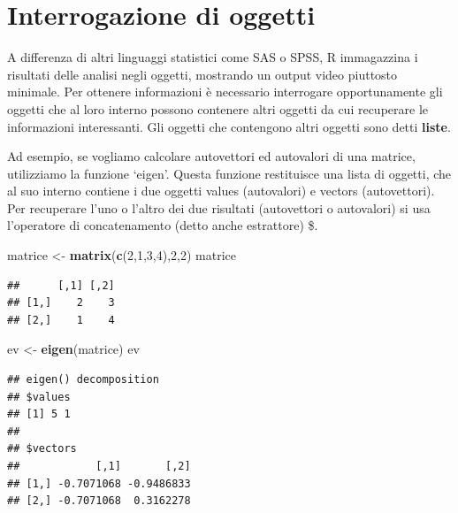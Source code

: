\documentclass[a4paper,12pt,oneside]{book}
\newenvironment{Shaded}{\begin{snugshade}}{\end{snugshade}}
\newcommand{\KeywordTok}[1]{\textcolor[rgb]{0.13,0.29,0.53}{\textbf{#1}}}
\newcommand{\DecValTok}[1]{\textcolor[rgb]{0.00,0.00,0.81}{#1}}
\newcommand{\StringTok}[1]{\textcolor[rgb]{0.31,0.60,0.02}{#1}}
\newcommand{\OperatorTok}[1]{\textcolor[rgb]{0.81,0.36,0.00}{\textbf{#1}}}
\newcommand{\NormalTok}[1]{#1}
\begin{document}
\section{Interrogazione di oggetti}\label{interrogazione-di-oggetti}

A differenza di altri linguaggi statistici come SAS o SPSS, R
immagazzina i risultati delle analisi negli oggetti, mostrando un output
video piuttosto minimale. Per ottenere informazioni è necessario
interrogare opportunamente gli oggetti che al loro interno possono
contenere altri oggetti da cui recuperare le informazioni interessanti.
Gli oggetti che contengono altri oggetti sono detti \textbf{liste}.

Ad esempio, se vogliamo calcolare autovettori ed autovalori di una
matrice, utilizziamo la funzione `eigen'. Questa funzione restituisce
una lista di oggetti, che al suo interno contiene i due oggetti values
(autovalori) e vectors (autovettori). Per recuperare l'uno o l'altro dei
due risultati (autovettori o autovalori) si usa l'operatore di
concatenamento (detto anche estrattore) \$.

\begin{Shaded}
\begin{Highlighting}[]
\NormalTok{matrice  <-}\StringTok{  }\KeywordTok{matrix}\NormalTok{(}\KeywordTok{c}\NormalTok{(}\DecValTok{2}\NormalTok{,}\DecValTok{1}\NormalTok{,}\DecValTok{3}\NormalTok{,}\DecValTok{4}\NormalTok{),}\DecValTok{2}\NormalTok{,}\DecValTok{2}\NormalTok{)}
\NormalTok{matrice}
\end{Highlighting}
\end{Shaded}

\begin{verbatim}
##      [,1] [,2]
## [1,]    2    3
## [2,]    1    4
\end{verbatim}

\begin{Shaded}
\begin{Highlighting}[]
\NormalTok{ev  <-}\StringTok{  }\KeywordTok{eigen}\NormalTok{(matrice)}
\NormalTok{ev}
\end{Highlighting}
\end{Shaded}

\begin{verbatim}
## eigen() decomposition
## $values
## [1] 5 1
## 
## $vectors
##            [,1]       [,2]
## [1,] -0.7071068 -0.9486833
## [2,] -0.7071068  0.3162278
\end{verbatim}

\begin{Shaded}
\end{Shaded}
\end{document}

